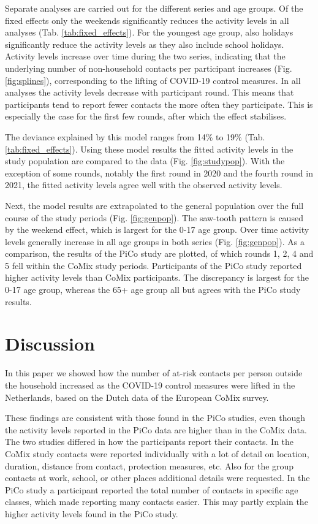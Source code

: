 \documentclass[fleqn,10pt]{wlscirep}
\begin{document}
Separate analyses are carried out for the different series and age groups. Of the fixed effects only the weekends significantly reduces the activity levels in all analyses (Tab. \ref{tab:fixed_effects}). For the youngest age group, also holidays significantly reduce the activity levels as they also include school holidays. Activity levels increase over time during the two series, indicating that the underlying number of non-household contacts per participant increases (Fig. \ref{fig:splines}), corresponding to the lifting of COVID-19 control measures. In all analyses the activity levels decrease with participant round. This means that participants tend to report fewer contacts the more often they participate. This is especially the case for the first few rounds, after which the effect stabilises.

The deviance explained by this model ranges from 14\% to 19\% (Tab. \ref{tab:fixed_effects}). Using these model results the fitted activity levels in the study population are compared to the data (Fig. \ref{fig:studypop}). With the exception of some rounds, notably the first round in 2020 and the fourth round in 2021, the fitted activity levels agree well with the observed activity levels.

Next, the model results are extrapolated to the general population over the full course of the study periods (Fig. \ref{fig:genpop}). The saw-tooth pattern is caused by the weekend effect, which is largest for the 0-17 age group. Over time activity levels generally increase in all age groups in both series (Fig. \ref{fig:genpop}). As a comparison, the results of the PiCo study \cite{Backer_2021} are plotted, of which rounds 1, 2, 4 and 5 fell within the CoMix study periods. Participants of the PiCo study reported higher activity levels than CoMix participants. The discrepancy is largest for the 0-17 age group, whereas the 65+ age group all but agrees with the PiCo study results.



\section*{Discussion}

In this paper we showed how the number of at-risk contacts per person outside the household increased as the COVID-19 control measures were lifted in the Netherlands, based on the Dutch data of the European CoMix survey.

These findings are consistent with those found in the PiCo studies, even though the activity levels reported in the PiCo data are higher than in the CoMix data. The two studies differed in how the participants report their contacts. In the CoMix study contacts were reported individually with a lot of detail on location, duration, distance from contact, protection measures, etc. Also for the group contacts at work, school, or other places additional details were requested. In the PiCo study a participant reported the total number of contacts in specific age classes, which made reporting many contacts easier. This may partly explain the higher activity levels found in the PiCo study.
\end{document}
